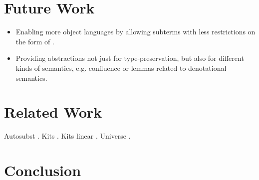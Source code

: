 \documentclass[sigplan,10pt, anonymous]{acmart}
\newcommand*\ACode[1]{\AgdaFontStyle{\textcolor{mygray}{#1}}}
\begin{document}
  \section{Future Work}
  \label{sec:future}
  \begin{itemize}
  \item
    Enabling more object languages by allowing subterms with less
    restrictions on the form of \ACode{S}.
  \item
    Providing abstractions not just for type-preservation, but also
    for different kinds of semantics, e.g. confluence or lemmas related
    to denotational semantics.
  \end{itemize}

  \section{Related Work}
  \label{sec:related}
  Autosubst \cite{DBLP:conf/cpp/StarkSK19, DBLP:conf/itp/SchaferTS15}.
  Kits \cite{DBLP:journals/jar/BentonHKM12, unpublished:mcbride2005kits}.
  Kits linear \cite{DBLP:journals/corr/abs-2005-02247}.
  Universe \cite{DBLP:journals/pacmpl/AllaisA0MM18}.

  \section{Conclusion}
  \label{sec:conclusion}

  

  \clearpage
  \appendix
\end{document}
